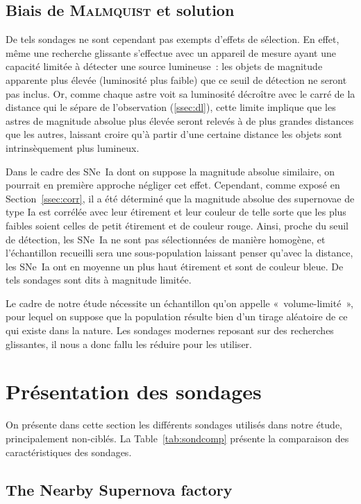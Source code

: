 \documentclass[../main/main.tex]{subfiles}
\begin{document}
\subsection{Biais de \textsc{Malmquist} et solution}\label{ssec:malm}

De tels sondages ne sont cependant pas exempts d'effets de sélection. En effet,
même une recherche glissante s'effectue avec un appareil de mesure ayant une
capacité limitée à détecter une source lumineuse~: les objets de magnitude
apparente plus élevée (luminosité plus faible) que ce seuil de détection ne
seront pas inclus. Or, comme chaque astre voit sa luminosité décroître avec le
carré de la distance qui le sépare de l'observation (\ref{ssec:dl}), cette
limite implique que les astres de magnitude absolue plus élevée seront relevés à
de plus grandes distances que les autres, laissant croire qu'à partir d'une
certaine distance les objets sont intrinsèquement plus lumineux.

Dans le cadre des SNe~Ia dont on suppose la magnitude absolue similaire, on
pourrait en première approche négliger cet effet. Cependant, comme exposé en
Section~\ref{ssec:corr}, il a été déterminé que la magnitude absolue des
supernovae de type Ia est corrélée avec leur étirement et leur couleur de
telle sorte que les plus faibles soient celles de petit étirement et de couleur
rouge. Ainsi, proche du seuil de détection, les SNe~Ia ne sont pas sélectionnées
de manière homogène, et l'échantillon recueilli sera une sous-population
laissant penser qu'avec la distance, les SNe~Ia ont en moyenne un plus haut
étirement et sont de couleur bleue. De tels sondages sont dits à magnitude
limitée.

Le cadre de notre étude nécessite un échantillon qu'on appelle
«~volume-limité~», pour lequel on suppose que la population résulte bien d'un
tirage aléatoire de ce qui existe dans la nature. Les sondages modernes reposant
sur des recherches glissantes, il nous a donc fallu les réduire pour les
utiliser.

\section{Présentation des sondages}\label{sec:surveys}
On présente dans cette section les différents sondages utilisés dans notre
étude, principalement non-ciblés. La Table~\ref{tab:sondcomp} présente la
comparaison des caractéristiques des sondages.

\subsection{The Nearby Supernova factory}\label{ssec:snf}
\end{document}
